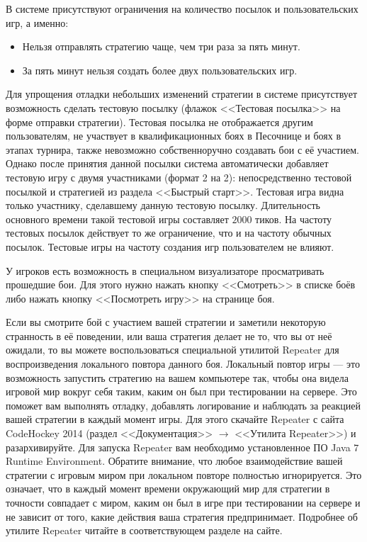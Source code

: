 В системе присутствуют ограничения на количество посылок и пользовательских игр, а именно:
\vspace{-0.15in}
\begin{itemize}
  \item Нельзя отправлять стратегию чаще, чем три раза за пять минут.
\vspace{-0.10in}
  \item За пять минут нельзя создать более двух пользовательских игр.
\vspace{-0.10in}
\end{itemize}

Для упрощения отладки небольших изменений стратегии в системе присутствует возможность сделать тестовую посылку (флажок <<Тестовая посылка>>
на форме отправки стратегии). Тестовая посылка не отображается другим пользователям, не участвует в квалификационных боях в Песочнице и боях
в этапах турнира, также невозможно собственноручно создавать бои с её участием. Однако после принятия данной посылки система автоматически
добавляет тестовую игру с двумя участниками (формат 2 на 2): непосредственно тестовой посылкой и стратегией из раздела <<Быстрый старт>>.
Тестовая игра видна только участнику, сделавшему данную тестовую посылку. Длительность основного времени такой тестовой игры составляет
$2000$ тиков. На частоту тестовых посылок действует то же ограничение, что и на частоту обычных посылок. Тестовые игры на частоту создания
игр пользователем не влияют.

У игроков есть возможность в специальном визуализаторе просматривать прошедшие бои. Для этого нужно нажать кнопку <<Смотреть>> в списке боёв
либо нажать кнопку <<Посмотреть игру>> на странице боя.

Если вы смотрите бой с участием вашей стратегии и заметили некоторую странность в её поведении, или ваша стратегия делает не то, что вы от
неё ожидали, то вы можете воспользоваться специальной утилитой Repeater для воспроизведения локального повтора данного боя. Локальный повтор
игры --- это возможность запустить стратегию на вашем компьютере так, чтобы она видела игровой мир вокруг себя таким, каким он был при
тестировании на сервере. Это поможет вам выполнять отладку, добавлять логирование и наблюдать за реакцией вашей стратегии в каждый момент
игры. Для этого скачайте Repeater с сайта CodeHockey 2014 (раздел <<Документация>> $\rightarrow$ <<Утилита Repeater>>) и разархивируйте. Для
запуска Repeater вам необходимо установленное ПО Java $7$ Runtime Environment. Обратите внимание, что любое взаимодействие вашей стратегии с
игровым миром при локальном повторе полностью игнорируется. Это означает, что в каждый момент времени окружающий мир для стратегии в
точности совпадает с миром, каким он был в игре при тестировании на сервере и не зависит от того, какие действия ваша стратегия
предпринимает. Подробнее об утилите Repeater читайте в соответствующем разделе на сайте.

